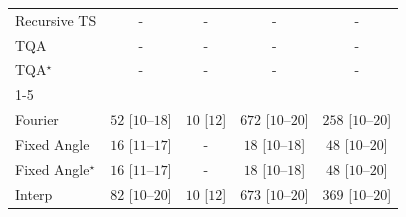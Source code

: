 \begin{tabular}{l|cccc|}
Recursive TS & {\cellcolor[HTML]{000000}} \color[HTML]{F1F1F1} {\cellcolor{white}} \color{black} - & {\cellcolor[HTML]{000000}} \color[HTML]{F1F1F1} {\cellcolor{white}} \color{black} - & {\cellcolor[HTML]{000000}} \color[HTML]{F1F1F1} {\cellcolor{white}} \color{black} - & {\cellcolor[HTML]{000000}} \color[HTML]{F1F1F1} {\cellcolor{white}} \color{black} - \\
TQA & {\cellcolor[HTML]{000000}} \color[HTML]{F1F1F1} {\cellcolor{white}} \color{black} - & {\cellcolor[HTML]{000000}} \color[HTML]{F1F1F1} {\cellcolor{white}} \color{black} - & {\cellcolor[HTML]{000000}} \color[HTML]{F1F1F1} {\cellcolor{white}} \color{black} - & {\cellcolor[HTML]{000000}} \color[HTML]{F1F1F1} {\cellcolor{white}} \color{black} - \\
TQA$^\star$ & {\cellcolor[HTML]{000000}} \color[HTML]{F1F1F1} {\cellcolor{white}} \color{black} - & {\cellcolor[HTML]{000000}} \color[HTML]{F1F1F1} {\cellcolor{white}} \color{black} - & {\cellcolor[HTML]{000000}} \color[HTML]{F1F1F1} {\cellcolor{white}} \color{black} - & {\cellcolor[HTML]{000000}} \color[HTML]{F1F1F1} {\cellcolor{white}} \color{black} - \\
\cline{1-5}
\multicolumn{5}{c}{\rule{0pt}{8pt}SV} \\
\midrule
Fourier & {\cellcolor[HTML]{EEF8EA}} \color[HTML]{000000} $52$ [$10$--$18$] & {\cellcolor[HTML]{F7FCF5}} \color[HTML]{000000} $10$ [$12$] & {\cellcolor[HTML]{00441B}} \color[HTML]{F1F1F1} $672$ [$10$--$20$] & {\cellcolor[HTML]{A2D99C}} \color[HTML]{000000} $258$ [$10$--$20$] \\
Fixed Angle & {\cellcolor[HTML]{F6FCF4}} \color[HTML]{000000} $16$ [$11$--$17$] & {\cellcolor[HTML]{000000}} \color[HTML]{F1F1F1} {\cellcolor{white}} \color{black} - & {\cellcolor[HTML]{F5FBF3}} \color[HTML]{000000} $18$ [$10$--$18$] & {\cellcolor[HTML]{EFF9EC}} \color[HTML]{000000} $48$ [$10$--$20$] \\
Fixed Angle$^\star$ & {\cellcolor[HTML]{F6FCF4}} \color[HTML]{000000} $16$ [$11$--$17$] & {\cellcolor[HTML]{000000}} \color[HTML]{F1F1F1} {\cellcolor{white}} \color{black} - & {\cellcolor[HTML]{F5FBF3}} \color[HTML]{000000} $18$ [$10$--$18$] & {\cellcolor[HTML]{EFF9EC}} \color[HTML]{000000} $48$ [$10$--$20$] \\
Interp & {\cellcolor[HTML]{E8F6E3}} \color[HTML]{000000} $82$ [$10$--$20$] & {\cellcolor[HTML]{F7FCF5}} \color[HTML]{000000} $10$ [$12$] & {\cellcolor[HTML]{00441B}} \color[HTML]{F1F1F1} $673$ [$10$--$20$] & {\cellcolor[HTML]{63BC6E}} \color[HTML]{F1F1F1} $369$ [$10$--$20$] \\

\end{tabular}
